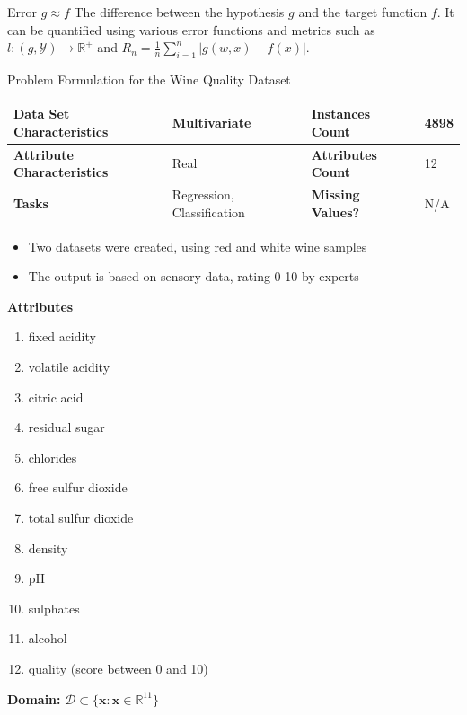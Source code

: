 \begin{definitionbox}{Error \(g \approx f\)}
The difference between the hypothesis \(g\) and the target function \(f\). It can be quantified using various error functions and metrics such as \( l: (g, \mathcal{Y}) \rightarrow \mathbb{R}^+ \) and \( R_n = \frac{1}{n} \sum_{i=1}^{n} |g(w,x) - f(x)| \).
\end{definitionbox}

\begin{examplebox}{Problem Formulation for the Wine Quality Dataset}


\begin{tabular}{|l|l|l|l|}
\hline
\textbf{Data Set Characteristics}  & Multivariate               & \textbf{Instances Count}  & 4898 \\ \hline
\textbf{Attribute Characteristics} & Real                       & \textbf{Attributes Count} & 12   \\ \hline
\textbf{Tasks}                     & Regression, Classification & \textbf{Missing Values?}  & N/A  \\ \hline
\end{tabular}



\begin{itemize}
    \item Two datasets were created, using red and white wine samples
    \item The output is based on sensory data, rating 0-10 by experts
\end{itemize}


\textbf{Attributes}
\begin{enumerate}[nolistsep]
    \item fixed acidity
    \item volatile acidity
    \item citric acid
    \item residual sugar
    \item chlorides
    \item free sulfur dioxide
    \item total sulfur dioxide
    \item density
    \item pH
    \item sulphates
    \item alcohol
    \item quality (score between 0 and 10)
\end{enumerate} 
\vspace{\baselineskip}
\textbf{Domain:} $\mathcal{D}\subset\{\mathbf{x}:\mathbf{x}\in\mathbb{R}^{11}\}$


\end{examplebox}
